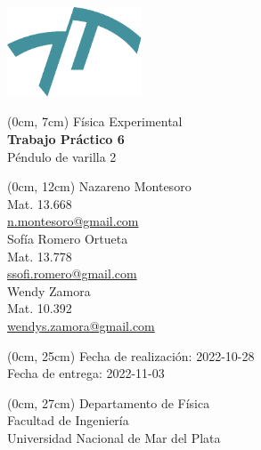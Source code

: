 \newcommand{\materia}[1]{{\huge #1}\\\vspace{0.5cm}}
\newcommand{\titulo}[1]{{\Huge \textbf{#1}}\\\vspace{0.5cm}}
\newcommand{\subtitulo}[1]{{\huge #1}\\\vspace{0.5cm}}
\newcommand{\autor}[3]{#1\\{\small Mat. #2\\\href{mailto:#3}{#3}}\\\vspace{0.7cm}}
\newcommand{\fecha}[4]{{\small Fecha de #1: #4-#3-#2}\\} %
\newcommand{\departamento}[1]{{\small Departamento de #1\\Facultad de Ingeniería\\Universidad Nacional de Mar del Plata}}
\newenvironment{mytitlepage}
    {\pagenumbering{gobble}\begin{center}}
    {\end{center}\newpage\pagenumbering{arabic}}

\begin{mytitlepage}
    \includegraphics[width=4cm]{img/logo-fi.pdf}
   
    \begin{textblock*}{\paperwidth}(0cm, 7cm)
    \materia{Física Experimental}
    \titulo{Trabajo Práctico 6}
    \subtitulo{Péndulo de varilla 2}
    \end{textblock*}
    
    \begin{textblock*}{\paperwidth}(0cm, 12cm)
    \autor{Nazareno Montesoro}{13.668}{n.montesoro@gmail.com}
    \autor{Sofía Romero Ortueta}{13.778}{ssofi.romero@gmail.com}
    \autor{Wendy Zamora}{10.392}{wendys.zamora@gmail.com}
    \end{textblock*}
    
    \begin{textblock*}{\paperwidth}(0cm, 25cm) 
    \fecha{realización}{28}{10}{2022}
    \fecha{entrega}{03}{11}{2022}
    \end{textblock*}
    
    \begin{textblock*}{\paperwidth}(0cm, 27cm) 
    \departamento{Física}
    \end{textblock*}
\end{mytitlepage}
